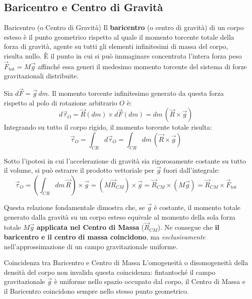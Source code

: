 \subsection{Baricentro e Centro di Gravità}

\begin{definizione}{Baricentro (o Centro di Gravità)}
Il \textbf{baricentro} (o centro di gravità) di un corpo esteso è il punto geometrico rispetto al quale il momento torcente totale della forza di gravità, agente su tutti gli elementi infinitesimi di massa del corpo, risulta nullo. È il punto in cui si può immaginare concentrata l'intera forza peso $\vec{F}_{\text{tot}} = M\vec{g}$ affinché essa generi il medesimo momento torcente del sistema di forze gravitazionali distribuite.
\end{definizione}

Sia $d\vec{F} = \vec{g} \, dm$. Il momento torcente infinitesimo generato da questa forza rispetto al polo di rotazione arbitrario $O$ è:
\begin{equation}
    d\vec{\tau}_O = \vec{R}(dm) \times d\vec{F}(dm) = dm \, (\vec{R} \times \vec{g})
\end{equation}
Integrando su tutto il corpo rigido, il momento torcente totale risulta:
\begin{equation}
    \vec{\tau}_O = \int_{CR} d\vec{\tau}_O = \int_{CR} dm \, (\vec{R} \times \vec{g})
\end{equation}

Sotto l'ipotesi in cui l'accelerazione di gravità sia rigorosamente costante su tutto il volume, si può estrarre il prodotto vettoriale per $\vec{g}$ fuori dall'integrale:
\begin{equation}
    \vec{\tau}_O = \left( \int_{CR} dm \, \vec{R} \right) \times \vec{g} = (M \vec{R}_{CM}) \times \vec{g} = \vec{R}_{CM} \times (M \vec{g}) = \vec{R}_{CM} \times \vec{F}_{\text{tot}}
\end{equation}

Questa relazione fondamentale dimostra che, se $\vec{g}$ è costante, il momento totale generato dalla gravità su un corpo esteso equivale al momento della sola forza totale $M\vec{g}$ \textbf{applicata nel Centro di Massa} ($\vec{R}_{CM}$). 
Ne consegue che \textbf{il baricentro e il centro di massa coincidono}, ma \textit{esclusivamente} nell'approssimazione di un campo gravitazionale uniforme.

\begin{osservazione}{Coincidenza tra Baricentro e Centro di Massa}
L'omogeneità o disomogeneità della densità del corpo non invalida questa coincidenza: fintantoché il campo gravitazionale $\vec{g}$ è uniforme nello spazio occupato dal corpo, il Centro di Massa e il Baricentro coincidono sempre nello stesso punto geometrico.
\end{osservazione}

